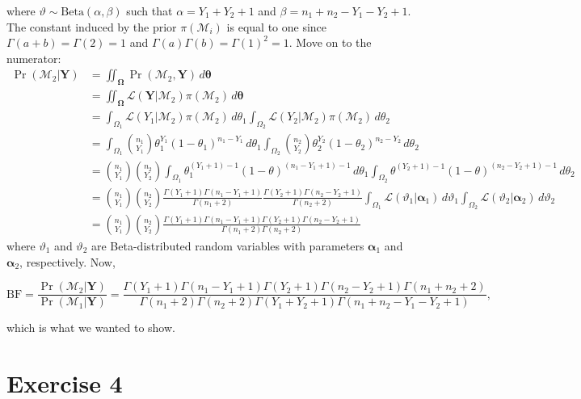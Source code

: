 \documentclass[
]{homework}
\begin{document}
where \(\vartheta \sim \mathrm{Beta}(\alpha, \beta)\) such that \(\alpha = Y_1 + Y_2 + 1\) and \(\beta = n_1 + n_2 - Y_1 - Y_2 + 1\). The constant induced by the prior \(\pi(\mathcal M_i)\) is equal to one since \(\Gamma(a + b) = \Gamma(2) = 1\) and \(\Gamma(a)\Gamma(b) = \Gamma(1)^2 = 1\). Move on to the numerator:
\begin{align*}
  \Pr(\mathcal M_2 | \mathbf Y)
  &= \iint_{\boldsymbol\Omega} \Pr(\mathcal M_2, \mathbf Y) \, d\boldsymbol\theta \\
  &= \iint_{\boldsymbol\Omega} \mathcal L(\mathbf Y | \mathcal M_2) \pi(\mathcal M_2) \, d\boldsymbol\theta \\
  &= \int_{\Omega_1} \mathcal L(Y_1 | \mathcal M_2) \pi(\mathcal M_2) \, d\theta_1 \int_{\Omega_2} \mathcal L(Y_2 | \mathcal M_2) \pi(\mathcal M_2) \, d\theta_2 \\
  &= \int_{\Omega_1} \binom{n_1}{Y_1} \theta_1^{Y_1} (1 - \theta_1)^{n_1 - Y_1} \, d\theta_1 \int_{\Omega_2} \binom{n_2}{Y_2} \theta_2^{Y_2} (1 - \theta_2)^{n_2 - Y_2} \, d\theta_2 \\
  &= \binom{n_1}{Y_1}\binom{n_2}{Y_2} \int_{\Omega_1} \theta_1^{(Y_1 + 1) - 1} (1 - \theta)^{(n_1 - Y_1 + 1) - 1} \, d\theta_1 \int_{\Omega_2} \theta^{(Y_2 + 1) - 1} (1 - \theta)^{(n_2 - Y_2 + 1) - 1} \, d\theta_2 \\
  &= \binom{n_1}{Y_1}\binom{n_2}{Y_2} \frac{\Gamma(Y_1 + 1)\Gamma(n_1 - Y_1 + 1)}{\Gamma(n_1 + 2)} \frac{\Gamma(Y_2 + 1)\Gamma(n_2 - Y_2 + 1)}{\Gamma(n_2 + 2)} \int_{\Omega_1} \mathcal L(\vartheta_1 | \boldsymbol\alpha_1) \, d\vartheta_1 \int_{\Omega_2} \mathcal L(\vartheta_2 | \boldsymbol\alpha_2) \, d\vartheta_2 \\
  &= \binom{n_1}{Y_1} \binom{n_2}{Y_2} \frac{\Gamma(Y_1 + 1)\Gamma(n_1 - Y_1 + 1)\Gamma(Y_2 + 1)\Gamma(n_2 - Y_2 + 1)}{\Gamma(n_1 + 2)\Gamma(n_2 + 2)}
\end{align*}
where \(\vartheta_1\) and \(\vartheta_2\) are Beta-distributed random variables with parameters \(\boldsymbol\alpha_1\) and \(\boldsymbol\alpha_2\), respectively. Now,

\[
\mathrm{BF} = \frac{\Pr(\mathcal M_2 | \mathbf Y)}{\Pr(\mathcal M_1 | \mathbf Y)} = \frac{\Gamma(Y_1 + 1) \Gamma(n_1 - Y_1 + 1) \Gamma(Y_2 + 1) \Gamma(n_2 - Y_2 + 1) \Gamma(n_1 + n_2 + 2)}{\Gamma(n_1 + 2) \Gamma(n_2 + 2) \Gamma(Y_1 + Y_2 + 1) \Gamma(n_1 + n_2 - Y_1 - Y_2 + 1)},
\]

which is what we wanted to show.

\newpage

\section{Exercise 4}\label{exercise-4}
\end{document}
